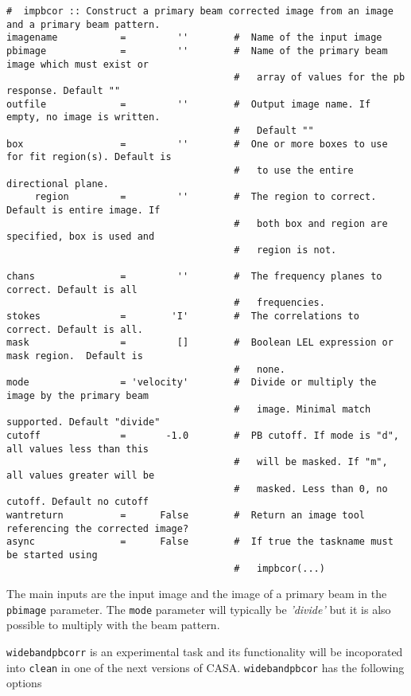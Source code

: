 \small
\begin{verbatim}
#  impbcor :: Construct a primary beam corrected image from an image and a primary beam pattern.
imagename           =         ''        #  Name of the input image
pbimage             =         ''        #  Name of the primary beam image which must exist or
                                        #   array of values for the pb response. Default ""
outfile             =         ''        #  Output image name. If empty, no image is written.
                                        #   Default ""
box                 =         ''        #  One or more boxes to use for fit region(s). Default is
                                        #   to use the entire directional plane.
     region         =         ''        #  The region to correct. Default is entire image. If
                                        #   both box and region are specified, box is used and
                                        #   region is not.

chans               =         ''        #  The frequency planes to correct. Default is all
                                        #   frequencies.
stokes              =        'I'        #  The correlations to correct. Default is all.
mask                =         []        #  Boolean LEL expression or mask region.  Default is
                                        #   none.
mode                = 'velocity'        #  Divide or multiply the image by the primary beam
                                        #   image. Minimal match supported. Default "divide"
cutoff              =       -1.0        #  PB cutoff. If mode is "d", all values less than this
                                        #   will be masked. If "m", all values greater will be
                                        #   masked. Less than 0, no cutoff. Default no cutoff
wantreturn          =      False        #  Return an image tool referencing the corrected image?
async               =      False        #  If true the taskname must be started using
                                        #   impbcor(...)
\end{verbatim}
\normalsize                             

The main inputs are the input image and the image of a primary beam in
the {\tt pbimage} parameter. The {\tt mode} parameter will typically
be {\it 'divide'} but it is also possible to multiply with the beam
pattern.

{\tt widebandpbcorr} is an experimental task and its functionality
will be incoporated into {\tt clean} in one of the next versions of
CASA. {\tt widebandpbcor} has the following options

